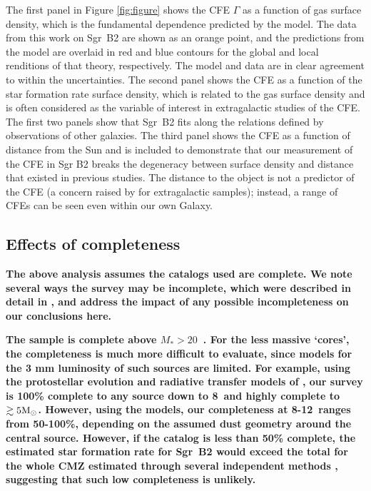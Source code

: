 \documentclass[twocolumn]{aastex62}
\def\referee#1{\textbf{#1}}
\begin{document}
The first panel in Figure \ref{fig:figure} shows the CFE $\Gamma$ as a function
of gas surface density, which is the fundamental dependence predicted by the
model. The data from this work on Sgr~B2 are shown as an orange point, and the
predictions from the \citet{Kruijssen2012a} model are overlaid in red and blue
contours for the global and local renditions of that theory, respectively. The
model and data are in clear agreement to within the uncertainties. The second
panel shows the CFE as a function of the star formation rate surface density,
which is related to the gas surface density
\citep[e.g.,][]{Kennicutt1998a,Bigiel2008a,Leroy2013a} and is often considered
as the variable of interest in extragalactic studies of the CFE. The first two
panels show that Sgr~B2 fits along the relations defined by observations of
other galaxies. The third panel shows the CFE as a function of distance from
the Sun and is included to demonstrate that our measurement of the CFE in Sgr
B2 breaks the degeneracy between surface density and distance that existed in
previous studies. The distance to the object is not a predictor of the CFE (a
concern raised by \citealt{Adamo2011a} for extragalactic samples); instead, a
range of CFEs can be seen even within our own Galaxy.

\subsection{Effects of completeness}
\referee{
The above analysis assumes the catalogs used are complete.  We note several
ways the survey may be incomplete, which were described in detail in
\citet{Ginsburg2018a}, and address the impact of any possible incompleteness
on our conclusions here.
}

\referee{
The sample is complete above $M_*>20$~\msun. For the less massive `cores', the
completeness is much more difficult to evaluate, since models for the 3 mm
luminosity of such sources are limited.  For example, using the protostellar
evolution and radiative transfer models of \citet{Zhang2018b}, our survey is
100\% complete to any source down to 8~\msun and highly complete to
$\gtrsim5\mathrm{M}_{\odot}$.  However, using the \citet{Robitaille2017a} models, our
completeness at 8-12~\msun ranges from 50-100\%, depending on the assumed
dust geometry around the central source.  However, if the catalog is less than 50\%
complete, the estimated star formation rate for Sgr~B2 would exceed
the total for the whole CMZ estimated through several independent methods
\citep{Barnes2017b}, suggesting that such low completeness is unlikely.
}
\end{document}
